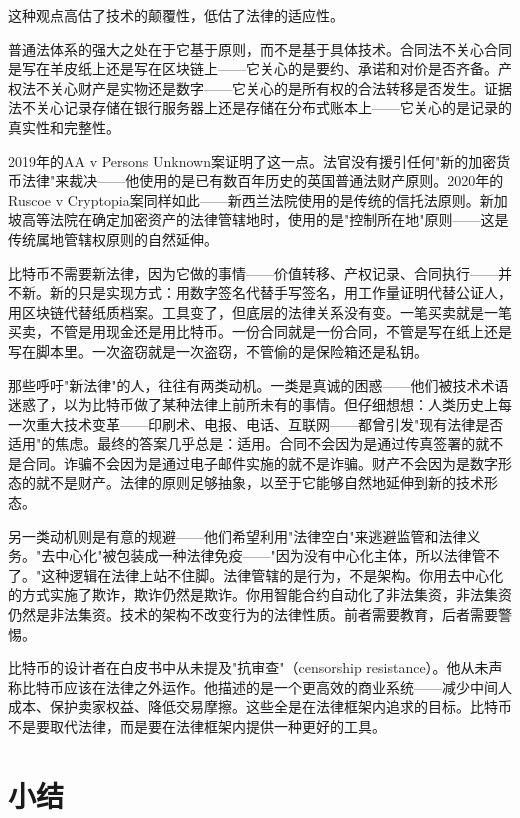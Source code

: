 \documentclass[a4paper,12pt,openany]{ctexbook}
\begin{document}
这种观点高估了技术的颠覆性，低估了法律的适应性。

普通法体系的强大之处在于它基于原则，而不是基于具体技术。合同法不关心合同是写在羊皮纸上还是写在区块链上——它关心的是要约、承诺和对价是否齐备。产权法不关心财产是实物还是数字——它关心的是所有权的合法转移是否发生。证据法不关心记录存储在银行服务器上还是存储在分布式账本上——它关心的是记录的真实性和完整性。

2019年的AA v Persons Unknown案证明了这一点。法官没有援引任何"新的加密货币法律"来裁决——他使用的是已有数百年历史的英国普通法财产原则。2020年的Ruscoe v Cryptopia案同样如此——新西兰法院使用的是传统的信托法原则。新加坡高等法院在确定加密资产的法律管辖地时，使用的是"控制所在地"原则——这是传统属地管辖权原则的自然延伸。

比特币不需要新法律，因为它做的事情——价值转移、产权记录、合同执行——并不新。新的只是实现方式：用数字签名代替手写签名，用工作量证明代替公证人，用区块链代替纸质档案。工具变了，但底层的法律关系没有变。一笔买卖就是一笔买卖，不管是用现金还是用比特币。一份合同就是一份合同，不管是写在纸上还是写在脚本里。一次盗窃就是一次盗窃，不管偷的是保险箱还是私钥。

那些呼吁"新法律"的人，往往有两类动机。一类是真诚的困惑——他们被技术术语迷惑了，以为比特币做了某种法律上前所未有的事情。但仔细想想：人类历史上每一次重大技术变革——印刷术、电报、电话、互联网——都曾引发"现有法律是否适用"的焦虑。最终的答案几乎总是：适用。合同不会因为是通过传真签署的就不是合同。诈骗不会因为是通过电子邮件实施的就不是诈骗。财产不会因为是数字形态的就不是财产。法律的原则足够抽象，以至于它能够自然地延伸到新的技术形态。

另一类动机则是有意的规避——他们希望利用"法律空白"来逃避监管和法律义务。"去中心化"被包装成一种法律免疫——"因为没有中心化主体，所以法律管不了。"这种逻辑在法律上站不住脚。法律管辖的是行为，不是架构。你用去中心化的方式实施了欺诈，欺诈仍然是欺诈。你用智能合约自动化了非法集资，非法集资仍然是非法集资。技术的架构不改变行为的法律性质。前者需要教育，后者需要警惕。

比特币的设计者在白皮书中从未提及"抗审查"（censorship resistance）。他从未声称比特币应该在法律之外运作。他描述的是一个更高效的商业系统——减少中间人成本、保护卖家权益、降低交易摩擦。这些全是在法律框架内追求的目标。比特币不是要取代法律，而是要在法律框架内提供一种更好的工具。


\section*{小结}
\end{document}
